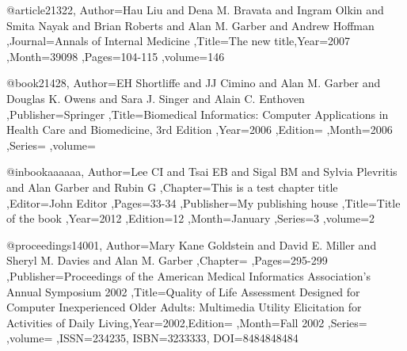 @article{21322, Author={Hau Liu and Dena M. Bravata and Ingram Olkin and Smita Nayak and Brian Roberts and Alan M. Garber and Andrew Hoffman },Journal={Annals of Internal Medicine },Title={The new title},Year={2007 },Month={39098 },Pages={104-115 },volume={146 } }

@book{21428, Author={EH Shortliffe and JJ Cimino and Alan M. Garber and Douglas K. Owens and Sara J. Singer and Alain C. Enthoven },Publisher={Springer },Title={Biomedical Informatics: Computer Applications in Health Care and Biomedicine, 3rd Edition },Year={2006 },Edition={ },Month={2006 },Series={ },volume={ } }				

@inbook{aaaaaa, Author={Lee CI and Tsai EB and Sigal BM and Sylvia Plevritis and Alan Garber and Rubin G },Chapter={This is a test chapter title },Editor={John Editor },Pages={33-34 },Publisher={My publishing house },Title={Title of the book },Year={2012 },Edition={12 },Month={January },Series={3 },volume={2 } }				

@proceedings{14001, Author={Mary Kane Goldstein and David E. Miller and Sheryl M. Davies and Alan M. Garber },Chapter={ },Pages={295-299 },Publisher={Proceedings of the American Medical Informatics Association's Annual Symposium 2002 },Title={Quality of Life Assessment Designed for Computer Inexperienced Older Adults: Multimedia Utility Elicitation for Activities of Daily Living},Year={2002},Edition={ },Month={Fall 2002 },Series={ },volume={ },ISSN={234235}, ISBN={3233333}, DOI={8484848484} }

